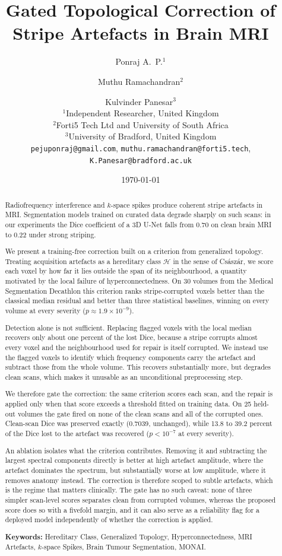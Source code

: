 \documentclass[12pt]{article}
\title{Gated Topological Correction of Stripe Artefacts in Brain MRI}
\author{
Ponraj A.~P.$^{1}$ \and Muthu Ramachandran$^{2}$ \and Kulvinder Panesar$^{3}$ \\[4pt]
\normalsize $^{1}$Independent Researcher, United Kingdom \\
\normalsize $^{2}$Forti5 Tech Ltd and University of South Africa \\
\normalsize $^{3}$University of Bradford, United Kingdom \\[2pt]
\normalsize \texttt{pejuponraj@gmail.com}, \texttt{muthu.ramachandran@forti5.tech}, \\
\normalsize \texttt{K.Panesar@bradford.ac.uk}
}
\date{\today}
\theoremstyle{definition}
\theoremstyle{plain}
\begin{document}
\maketitle

\begin{abstract}
Radiofrequency interference and $k$-space spikes produce coherent stripe artefacts
in MRI. Segmentation models trained on curated data degrade sharply on such scans:
in our experiments the Dice coefficient of a 3D U-Net falls from 0.70 on clean brain
MRI to 0.22 under strong striping.

We present a training-free correction built on a criterion from generalized
topology. Treating acquisition artefacts as a hereditary class $\mathcal{H}$ in the
sense of Cs\'asz\'ar, we score each voxel by how far it lies outside the span of its
neighbourhood, a quantity motivated by the local failure of hyperconnectedness. On
30 volumes from the Medical Segmentation Decathlon this criterion ranks
stripe-corrupted voxels better than the classical median residual and better than
three statistical baselines, winning on every volume at every severity
($p \approx 1.9\times 10^{-9}$).

Detection alone is not sufficient. Replacing flagged voxels with the local median
recovers only about one percent of the lost Dice, because a stripe corrupts almost
every voxel and the neighbourhood used for repair is itself corrupted. We instead
use the flagged voxels to identify which frequency components carry the artefact and
subtract those from the whole volume. This recovers substantially more, but degrades
clean scans, which makes it unusable as an unconditional preprocessing step.

We therefore gate the correction: the same criterion scores each scan, and the
repair is applied only when that score exceeds a threshold fitted on training data.
On 25 held-out volumes the gate fired on none of the clean scans and all of the
corrupted ones. Clean-scan Dice was preserved exactly (0.7039, unchanged), while
13.8 to 39.2 percent of the Dice lost to the artefact was recovered
($p < 10^{-7}$ at every severity).

An ablation isolates what the criterion contributes. Removing it and subtracting the
largest spectral components directly is better at high artefact amplitude, where the
artefact dominates the spectrum, but substantially worse at low amplitude, where it
removes anatomy instead. The correction is therefore scoped to subtle artefacts,
which is the regime that matters clinically. The gate has no such caveat: none of
three simpler scan-level scores separates clean from corrupted volumes, whereas the
proposed score does so with a fivefold margin, and it can also serve as a
reliability flag for a deployed model independently of whether the correction is
applied.

\medskip
\textbf{Keywords:} Hereditary Class, Generalized Topology, Hyperconnectedness, MRI
Artefacts, $k$-space Spikes, Brain Tumour Segmentation, MONAI.
\end{abstract}
\end{document}

